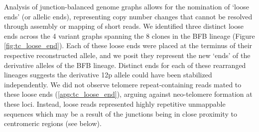 \documentclass[phd,tocprelim]{cornell}
\renewcommand{\caption}[1]{\singlespacing\hangcaption{#1}\normalspacing}
\begin{document}


Analysis of junction-balanced genome graphs allows for the nomination of ‘loose ends’ (or allelic ends), representing copy number changes that cannot be resolved through assembly or mapping of short reads. We identified three distinct loose ends across the 4 variant graphs spanning the 8 clones in the BFB lineage (Figure \ref{fig:tc_loose_end}). Each of these loose ends were placed at the terminus of their respective reconstructed allele, and we posit they represent the new ‘ends’ of the derivative alleles of the BFB lineage. Distinct ends for each of these rearranged lineages suggests the derivative 12p allele could have been stabilized independently. We did not observe telomere repeat-containing reads mated to these loose ends (\ref{app:tc_loose_end}), arguing against neo-telomere formation at these loci. Instead, loose reads represented highly repetitive unmappable sequences which may be a result of the junctions being in close proximity to centromeric regions (see below).
\end{document}
